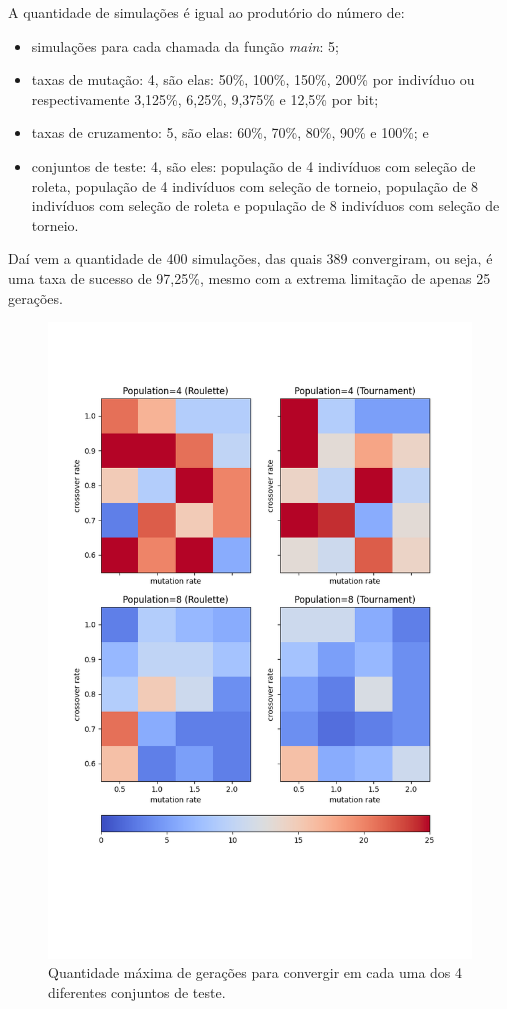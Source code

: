 \documentclass[12pt]{article}
\begin{document}
A quantidade de simulações é igual ao produtório do número de:

\begin{itemize}
    \item simulações para cada chamada da função \textit{main}: 5;
    \item taxas de mutação: 4, são elas: 50\%, 100\%, 150\%, 200\% por indivíduo ou respectivamente 3,125\%, 6,25\%, 9,375\% e 12,5\% por bit;
    \item taxas de cruzamento: 5, são elas: 60\%, 70\%, 80\%, 90\% e 100\%; e
    \item conjuntos de teste: 4, são eles: população de 4 indivíduos com seleção de roleta, população de 4 indivíduos com seleção de torneio, população de 8 indivíduos com seleção de roleta e população de 8 indivíduos com seleção de torneio.
\end{itemize}

Daí vem a quantidade de 400 simulações, das quais 389 convergiram, ou seja, é uma taxa de sucesso de 97,25\%, mesmo com a extrema limitação de apenas 25 gerações.

\begin{figure}
    \centering
    \includegraphics{fig/max_colors.png}
    \caption{Quantidade máxima de gerações para convergir em cada uma dos 4 diferentes conjuntos de teste.}
    \label{fig:max}
\end{figure}
\end{document}

